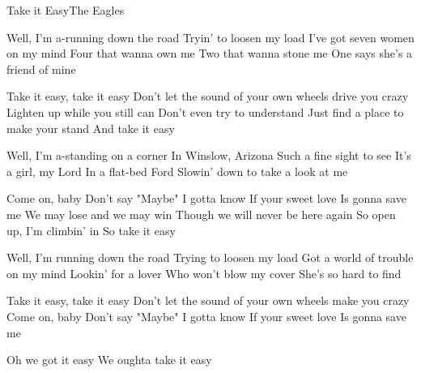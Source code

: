 \begin{Song}{Take it Easy}{The Eagles}
\begin{multicols}{2}

\begin{Verse}
Well, I'm a-running down the road
Tryin' to loosen my load
I've got seven women on my mind
Four that wanna own me
Two that wanna stone me
One says she's a friend of mine
\end{Verse}
\espaceInterStrophe

\begin{Chorus}
Take it easy, take it easy
Don't let the sound of your own wheels drive you crazy
Lighten up while you still can
Don't even try to understand
Just find a place to make your stand
And take it easy
\end{Chorus}
\espaceInterStrophe

\begin{Verse}
Well, I'm a-standing on a corner
In Winslow, Arizona
Such a fine sight to see
It's a girl, my Lord
In a flat-bed Ford
Slowin' down to take a look at me
\vfill
\columnbreak
\end{Verse}
\espaceInterStrophe

\begin{Chorus}
Come on, baby
Don't say "Maybe"
I gotta know
If your sweet love
Is gonna save me
We may lose and we may win
Though we will never be here again
So open up, I'm climbin' in
So take it easy

\end{Chorus}
\espaceInterStrophe

\begin{Verse}
Well, I'm running down the road
Trying to loosen my load
Got a world of trouble on my mind
Lookin' for a lover
Who won't blow my cover
She's so hard to find
\end{Verse}
\espaceInterStrophe

\begin{Chorus}
Take it easy, take it easy
Don't let the sound of your own wheels make you crazy
Come on, baby
Don't say "Maybe"
I gotta know
If your sweet love
Is gonna save me
\end{Chorus}
\espaceInterStrophe

\begin{Chorus}
Oh we got it easy
We oughta take it easy
\end{Chorus}

\end{multicols}

\vfill


\end{Song}
